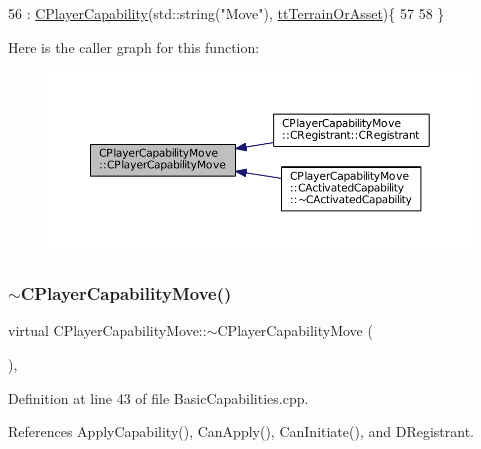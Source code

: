 \begin{DoxyCode}
56                                              : \hyperlink{classCPlayerCapability_a303de62aba5d3f65d9a8e013c64a96c1}{CPlayerCapability}(std::string(\textcolor{stringliteral}{"Move"}), 
      \hyperlink{classCPlayerCapability_a9d3450ed1532fd536bd6cbb1e2eef02fa67cc6d11bc0aafc1b786bd6557ba4aa2}{ttTerrainOrAsset})\{
57 
58 \}
\end{DoxyCode}
Here is the caller graph for this function\+:\nopagebreak
\begin{figure}[H]
\begin{center}
\leavevmode
\includegraphics[width=350pt]{classCPlayerCapabilityMove_a6bfe72663b6b5fc708d23373dc293ec7_icgraph}
\end{center}
\end{figure}
\hypertarget{classCPlayerCapabilityMove_ab355e3a0f8c82ee10b5ccf95c9e32d89}{}\label{classCPlayerCapabilityMove_ab355e3a0f8c82ee10b5ccf95c9e32d89} 
\subsubsection{\texorpdfstring{$\sim$\+C\+Player\+Capability\+Move()}{~CPlayerCapabilityMove()}}
{\footnotesize\ttfamily virtual C\+Player\+Capability\+Move\+::$\sim$\+C\+Player\+Capability\+Move (\begin{DoxyParamCaption}{ }\end{DoxyParamCaption})\hspace{0.3cm}{\ttfamily [inline]}, {\ttfamily [virtual]}}



Definition at line 43 of file Basic\+Capabilities.\+cpp.



References Apply\+Capability(), Can\+Apply(), Can\+Initiate(), and D\+Registrant.


